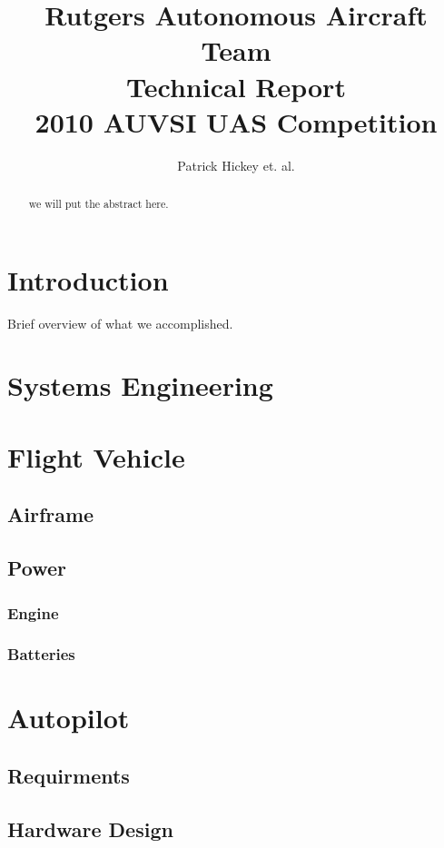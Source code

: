 \documentclass[12pt]{report}
\begin{document}
\title{Rutgers Autonomous Aircraft Team\\Technical Report\\2010 AUVSI UAS Competition}
\author{Patrick Hickey et. al.}


\begin{abstract}
we will put the abstract here.
\end{abstract}

\section{Introduction}

Brief overview of what we accomplished.

\section{Systems Engineering}

\section{Flight Vehicle}

\subsection{Airframe}

\subsection{Power}

\subsubsection{Engine}

\subsubsection{Batteries}

\section{Autopilot}

\subsection{Requirments}

\subsection{Hardware Design}
\end{document}
